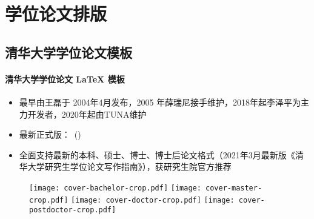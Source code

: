
\section{学位论文排版}
\subsection{\ThuThesis 清华大学学位论文模板}

\begin{frame}{\ThuThesis}
  \framesubtitle{清华大学学位论文 \LaTeX{} 模板}
  \begin{itemize}
  \item 最早由王磊于 2004年4月发布，2005 年薛瑞尼接手维护，2018年起李泽平为主力开发者，2020年起由TUNA维护
  \item 最新正式版：\ThuThesisVersion\ (\ThuThesisDate)
  \item 全面支持最新的本科、硕士、博士、博士后论文格式（2021年3月最新版《清华大学研究生学位论文写作指南》），获研究生院官方推荐 
  \end{itemize}
  \begin{figure}[htbp]
    \centering
    \texttt{[image: cover-bachelor-crop.pdf]}\hfill
    \texttt{[image: cover-master-crop.pdf]}\hfill
    \texttt{[image: cover-doctor-crop.pdf]}\hfill
    \texttt{[image: cover-postdoctor-crop.pdf]}
  \end{figure}
\end{frame}

